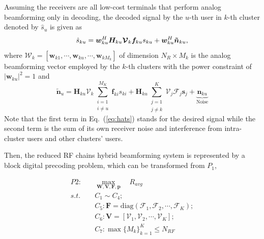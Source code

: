 \documentclass[conference]{IEEEtran}
\begin{document}
Assuming the receivers are all low-cost terminals that perform analog beamforming only in decoding, the decoded signal by the $u$-th user in $k$-th cluster denoted by $\hat{s}_u$ is given as
\begin{equation}{\label{eq:hats}}
\hat{s}_{ku} = \bm{w}_{ku}^H \bm{H}_{ku} \bm{\mathcal{V}}_k \bm{f}_{ku} s_{ku} + \bm{w}_{ku}^H \bm{\tilde{n}}_{ku},
\end{equation}
where $\bm{\mathcal{W}}_k=[{\bm w}_{k1},\cdots,{\bm w}_{ku},\cdots, {\bm w}_{kM_k}]$ of dimension $N_R\times M_k$ is the analog beamforming vector employed by the $k$-th clusters with the power constraint of $|\bm{w}_{ku}|^2=1$ and
\begin{equation}\label{Eq:ntilde}
\bm{\tilde{n}}_u=\bm{H}_{ku} \bm{\mathcal{V}}_k\sum_{\substack{i=1 \\ i\neq u}}^{M_K}\bm{f}_{ki}s_{ki} + \bm{H}_{ku}\sum_{\substack{j=1\\j\neq k}}^{K}\bm{\mathcal{V}}_j\bm{\mathcal{F}}_j\bm{s}_j+ \underbrace{\bm{n}_{ku}}_\text{Noise}
\end{equation}
Note that the first term in Eq.~(\ref{eq:hats}) stands for the desired signal while the second term is the sum of its own receiver noise and interference from intra-cluster users and other clusters' users.

Then, the reduced RF chains hybrid beamforming system is represented by a block digital precoding problem, which can be transformed from \textit{$P_1$},

\begin{align}\label{eq:P2}
P2: \quad&\max_{\bm W, \bm V,\bm F, \bm{p}}\quad R_{avg}\\ \nonumber
s.t. \quad&C_1 \sim C_4;\\
&C_5: \bm{F} = \text{diag}(\bm{\mathcal{F}}_1, \bm{\mathcal{F}}_2, \cdots, \bm{\mathcal{F}}_{K});\nonumber\\
&C_6: \bm{V} = [\bm{\mathcal{V}}_1, \bm{\mathcal{V}}_2, \cdots, \bm{\mathcal{V}}_K];\nonumber\\
&C_7: \max \{M_k\}_{k=1}^K \leq N_{RF}\nonumber
\end{align}
	
	
	
\end{document}
